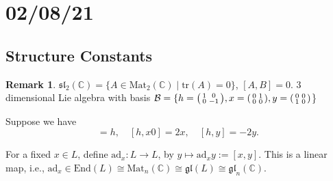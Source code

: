 \documentclass[12pt]{article}
\newenvironment{psmall}{\left(\begin{smallmatrix}}{\end{smallmatrix}\right)}
\theoremstyle{definition}
\theoremstyle{definition}
\newtheorem*{remark}{Remark}
\newcommand{\ad}[1]{\text{ad}_{#1}}
\newcommand{\C}{\mathbb{C}}
\newcommand{\mat}[2]{ \text{Mat} _{#1}(#2) }
\newcommand{\slin}[2]{\mathfrak{sl}_{#1}(#2)}
\newcommand{\End}[1]{ \text{End} (#1) }
\begin{document}
    \section{02/08/21}
        \subsection{Structure Constants}
            \begin{remark}
                $\slin{2}{\C}=\{A\in\mat{2}{\C}\mid\text{tr}(A)=0\}$, $[A,
                B]=0$. 3 dimensional Lie algebra with basis
                $\mathcal{B}=\{h=\begin{psmall}1&0\\0&-1\end{psmall},
                    x=\begin{psmall}0&1\\0&0\end{psmall},
                y=\begin{psmall}0&0\\1&0\end{psmall}$\}\par\hspace{4mm} Suppose we
                have 
                    \begin{equation*}
                        [x, y]=h, \quad[h, x0]=2x, \quad[h, y]=-2y.
                    \end{equation*}
            \end{remark}
            For a fixed $x\in L$, define $\ad{x}:L\to L$, by
            $y\mapsto\ad{x}{y}:=[x, y]$. This is a linear map, i.e.,
            $\ad{x}\in\End{L}\cong\mat{n}{\C}\cong\mathfrak{gl}(L)\cong\mathfrak{gl}_{n}(\C)$.
\end{document}
